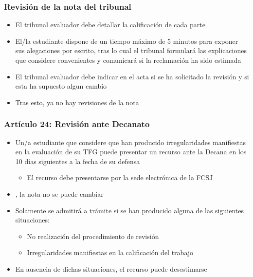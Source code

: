 \documentclass[aspectratio=43]{beamer}
\begin{document}
\begin{frame}
\frametitle{Revisión de la nota del tribunal}
\centering

\begin{itemize}
  \item El tribunal evaluador debe detallar la calificación de cada parte
  \item El/la estudiante dispone de un tiempo máximo de 5 minutos
  para exponer sus alegaciones por escrito, tras lo cual el tribunal formulará las
  explicaciones que considere convenientes y comunicará si la
  reclamación ha sido estimada
  \item El tribunal evaluador debe indicar en el acta si se ha solicitado la revisión y si esta ha supuesto algun cambio
  \item Tras esto, ya no hay revisiones de la nota
\end{itemize}

\end{frame}

\begin{frame}
\frametitle{Artículo 24: Revisión ante Decanato}
\centering

\begin{itemize}
  \item Un/a estudiante que considere que han producido irregularidades manifiestas en la evaluación de su TFG puede presentar un recurso ante la Decana en los 10 días siguientes a la fecha de su defensa
  \begin{itemize}
    \item El recurso debe presentarse por la sede electrónica de la FCSJ
  \end{itemize}
  \item {}, la nota no se puede cambiar
  \item Solamente se admitirá a trámite si se han producido alguna de las siguientes situaciones:
  \begin{itemize}
    \item No realización del procedimiento de revisión
    \item Irregularidades manifiestas en la calificación del trabajo
  \end{itemize}
  \item En ausencia de dichas situaciones, el recurso puede desestimarse
\end{itemize}

\end{frame}
\end{document}
